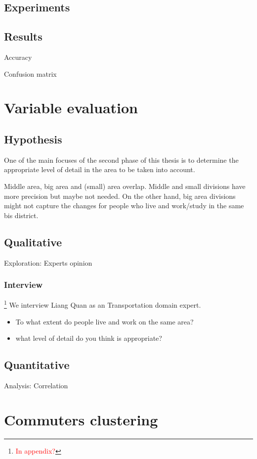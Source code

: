 \documentclass{article}
\newcommand{\selfnote}[1]{\footnote{\textcolor{red}{#1}}}
\begin{document}
\subsection{Experiments}

\subsection{Results}

Accuracy

Confusion matrix


\newpage
\section{Variable evaluation}
\subsection{Hypothesis}
One of the main focuses of the second phase of this thesis is to determine the appropriate level of detail in the area to be taken into account. 

Middle area, big area and (small) area overlap. Middle and small divisions have more precision but maybe not needed. On the other hand, big area divisions might not capture the changes for people who live and work/study in the same bis district. 

\subsection{Qualitative}
Exploration: Experts opinion

\subsubsection{Interview}
\selfnote{In appendix?}
We interview Liang Quan as an Transportation domain expert. 

\begin{itemize}
\item To what extent do people live and work on the same area?
\item what level of detail do you think is appropriate?
\end{itemize}

\subsection{Quantitative}
Analysis: Correlation


\newpage
\section{Commuters clustering}
\end{document}
